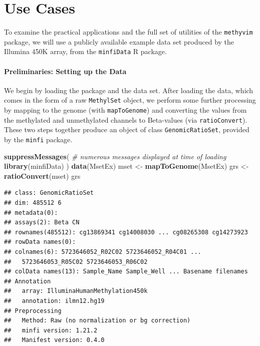 \documentclass[9pt,a4paper,]{extarticle}
\newenvironment{Shaded}{\begin{snugshade}}{\end{snugshade}}
\newcommand{\CommentTok}[1]{\textcolor[rgb]{0.56,0.35,0.01}{\textit{#1}}}
\newcommand{\KeywordTok}[1]{\textcolor[rgb]{0.13,0.29,0.53}{\textbf{#1}}}
\newcommand{\NormalTok}[1]{#1}
\newcommand{\StringTok}[1]{\textcolor[rgb]{0.31,0.60,0.02}{#1}}
\theoremstyle{definition}
\theoremstyle{definition}
\theoremstyle{definition}
\theoremstyle{remark}
\begin{document}
\hypertarget{use-cases}{%
\section{Use Cases}\label{use-cases}}

To examine the practical applications and the full set of utilities of the
\texttt{methyvim} package, we will use a publicly available example data set produced
by the Illumina 450K array, from the \texttt{minfiData} R package.

\hypertarget{preliminaries-setting-up-the-data}{%
\paragraph{Preliminaries: Setting up the Data}\label{preliminaries-setting-up-the-data}}

We begin by loading the package and the data set. After loading the data, which
comes in the form of a raw \texttt{MethylSet} object, we perform some further
processing by mapping to the genome (with \texttt{mapToGenome}) and converting the
values from the methylated and unmethylated channels to Beta-values
(via \texttt{ratioConvert}). These two steps together produce an object of class
\texttt{GenomicRatioSet}, provided by the \texttt{minfi} package.

\begin{Shaded}
\begin{Highlighting}[]
\KeywordTok{suppressMessages}\NormalTok{(}
  \CommentTok{# numerous messages displayed at time of loading}
  \KeywordTok{library}\NormalTok{(minfiData)}
\NormalTok{)}
\KeywordTok{data}\NormalTok{(MsetEx)}
\NormalTok{mset <-}\StringTok{ }\KeywordTok{mapToGenome}\NormalTok{(MsetEx)}
\NormalTok{grs <-}\StringTok{ }\KeywordTok{ratioConvert}\NormalTok{(mset)}
\NormalTok{grs}
\end{Highlighting}
\end{Shaded}

\begin{verbatim}
## class: GenomicRatioSet 
## dim: 485512 6 
## metadata(0):
## assays(2): Beta CN
## rownames(485512): cg13869341 cg14008030 ... cg08265308 cg14273923
## rowData names(0):
## colnames(6): 5723646052_R02C02 5723646052_R04C01 ...
##   5723646053_R05C02 5723646053_R06C02
## colData names(13): Sample_Name Sample_Well ... Basename filenames
## Annotation
##   array: IlluminaHumanMethylation450k
##   annotation: ilmn12.hg19
## Preprocessing
##   Method: Raw (no normalization or bg correction)
##   minfi version: 1.21.2
##   Manifest version: 0.4.0
\end{verbatim}
\end{document}
